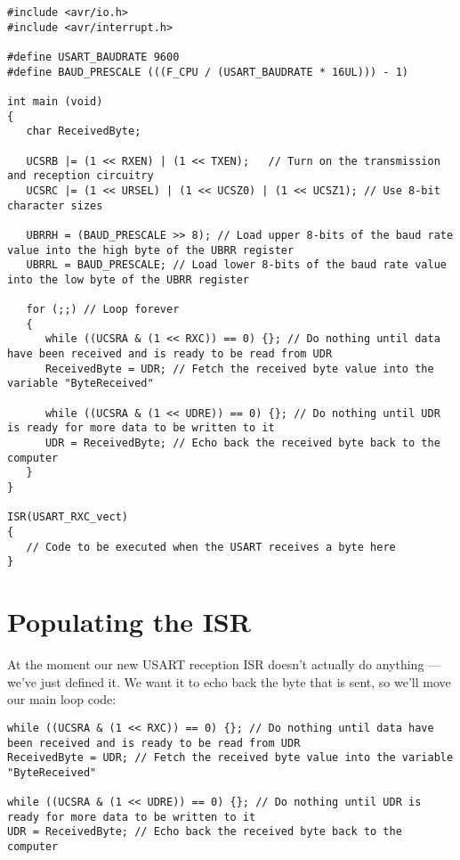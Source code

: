 \documentclass[a4paper,oneside,notitlepage]{book}
\begin{document}
\begin{center}
\begin{lstlisting}
#include <avr/io.h>
#include <avr/interrupt.h>

#define USART_BAUDRATE 9600
#define BAUD_PRESCALE (((F_CPU / (USART_BAUDRATE * 16UL))) - 1)

int main (void)
{
   char ReceivedByte;

   UCSRB |= (1 << RXEN) | (1 << TXEN);   // Turn on the transmission and reception circuitry
   UCSRC |= (1 << URSEL) | (1 << UCSZ0) | (1 << UCSZ1); // Use 8-bit character sizes

   UBRRH = (BAUD_PRESCALE >> 8); // Load upper 8-bits of the baud rate value into the high byte of the UBRR register
   UBRRL = BAUD_PRESCALE; // Load lower 8-bits of the baud rate value into the low byte of the UBRR register

   for (;;) // Loop forever
   {
      while ((UCSRA & (1 << RXC)) == 0) {}; // Do nothing until data have been received and is ready to be read from UDR
      ReceivedByte = UDR; // Fetch the received byte value into the variable "ByteReceived"

      while ((UCSRA & (1 << UDRE)) == 0) {}; // Do nothing until UDR is ready for more data to be written to it
      UDR = ReceivedByte; // Echo back the received byte back to the computer
   }   
}

ISR(USART_RXC_vect)
{
   // Code to be executed when the USART receives a byte here
}
\end{lstlisting}
\end{center}


\chapter{Populating the ISR}

At the moment our new USART reception ISR doesn't actually do anything --- we've just defined it. We want it to echo back the byte that is sent, so we'll move our main loop code:

\begin{center}
\begin{lstlisting}
while ((UCSRA & (1 << RXC)) == 0) {}; // Do nothing until data have been received and is ready to be read from UDR
ReceivedByte = UDR; // Fetch the received byte value into the variable "ByteReceived"

while ((UCSRA & (1 << UDRE)) == 0) {}; // Do nothing until UDR is ready for more data to be written to it
UDR = ReceivedByte; // Echo back the received byte back to the computer
\end{lstlisting}
\end{center}
\end{document}
